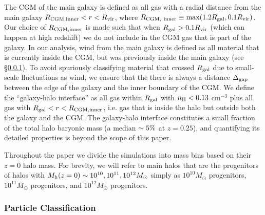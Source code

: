 \documentclass[fleqn,usenatbib]{mnras}
\begin{document}
The CGM of the main galaxy is defined as all gas with a radial distance from the main galaxy $ R_{\rm CGM, inner} < r < R_{\rm vir}$, where $R_{\rm CGM,~inner} \equiv \max( 1.2 R_{\rm gal}, 0.1 R_{\rm vir})$.
Our choice of $R_{\rm CGM, inner}$ is made such that when $ R_{\rm gal} > 0.1 R_{\rm vir}$ (which can happen at high redshift) we do not include in the CGM gas that is part of the galaxy.
In our analysis, wind  from the main galaxy is defined as all material that is currently inside the CGM, but was previously inside the main galaxy (see \S\ref{sec:classifications}).
To avoid spuriously classifying material that crossed $R_{\rm gal}$ due to small-scale fluctuations as wind, we ensure that the there is always a distance $\Delta_{\rm gap}$ between the edge of the galaxy and the inner boundary of the CGM. 
We define the ``galaxy-halo interface'' as all gas within $R_{\rm gal}$ with $n_{\rm H} < 0.13$ cm$^{-3}$ plus all gas with $R_{\rm gal} < r < R_{\rm CGM,inner}$, i.e. gas that is inside the halo but outside both the galaxy and the CGM. 
The galaxy-halo interface constitutes a small fraction of the total halo baryonic mass (a median $\sim5\%$ at $z=0.25$), and quantifying its detailed properties is beyond the scope of this paper.

Throughout the paper we divide the simulations into mass bins based on their $z=0$ halo mass.
For brevity, we will refer to main halos that are the progenitors of halos with $M_{\rm h}(z=0) \sim 10^{10}, 10^{11}, 10^{12} M_\odot$ simply as  $10^{10} M_\odot$ progenitors,  $10^{11} M_\odot$ progenitors, and $10^{12} M_\odot$ progenitors.

\subsubsection{Particle Classification}
\label{sec:classifications}
\end{document}
